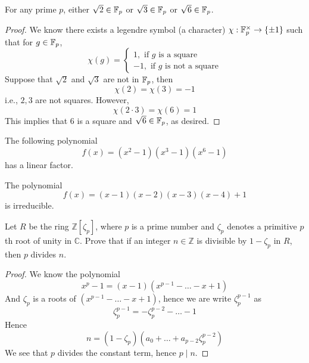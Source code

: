 \begin{prop}
    For any prime $p$, either $\sqrt{2}\in\mathbb{F}_p$ or $\sqrt{3}\in\mathbb{F}_p$ or $\sqrt{6}\in\mathbb{F}_p$.
\end{prop}
\begin{proof}
    We know there exists a legendre symbol (a character) $\chi: \mathbb{F}_p^\times\to \{\pm 1\}$ such that for $g\in\mathbb{F}_p$,
    \begin{equation*}
        \chi(g)=\begin{cases}
            1, \text{ if $g$ is a square}\\
            -1, \text{ if $g$ is not a square}
        \end{cases}
    \end{equation*}
    Suppose that $\sqrt{2}$ and $\sqrt{3}$ are not in $\mathbb{F}_p$, then 
    \begin{equation*}
        \chi(2)=\chi(3)=-1
    \end{equation*}
    i.e., $2,3$ are not squares. However,
    \begin{equation*}
        \chi(2\cdot 3)=\chi(6)=1
    \end{equation*} 
    This implies that $6$ is a square and $\sqrt{6}\in\mathbb{F}_p$, as desired.
\end{proof}

\begin{cor}
    The following polynomial 
    \begin{equation*}
        f(x)=(x^2-1)(x^3-1)(x^6-1)
    \end{equation*}
    has a linear factor.
\end{cor}


\begin{prop}
    The polynomial 
    \begin{equation*}
        f(x)=(x-1)(x-2)(x-3)(x-4)+1
    \end{equation*}
    is irreducible.
\end{prop}





\begin{prob}[S2018-Q3]
    Let \(R\) be the ring \(\mathbb{Z}[\zeta_p]\), where \(p\) is a prime number and \(\zeta_p\) denotes a primitive \(p\)th root of unity in \(\mathbb{C}\). Prove that if an integer \(n \in \mathbb{Z}\) is divisible by \(1 - \zeta_p\) in \(R\), then \(p\) divides \(n\).
\end{prob}
\begin{proof}
    We know the polynomial 
    \begin{equation*}
        x^p-1=(x-1)(x^{p-1}-\dots-x+1)
    \end{equation*}
    And $\zeta_p$ is a roots of $(x^{p-1}-\dots-x+1)$, hence we are write $\zeta_p^{p-1}$ as 
    \begin{equation*}
        \zeta_p^{p-1}=-\zeta_p^{p-2}-\dots-1
    \end{equation*}
    Hence 
    \begin{equation*}
        n=(1-\zeta_p)(a_0+\dots+a_{p-2}\zeta_p^{p-2})
    \end{equation*}
    We see that $p$ divides the constant term, hence $p\mid n$.
\end{proof}




